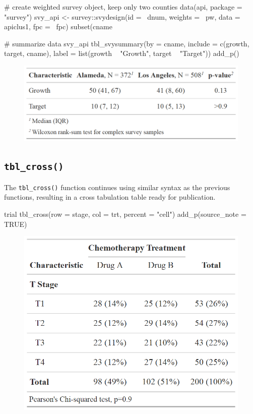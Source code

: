 \begin{example}
# create weighted survey object, keep only two counties
data(api, package = "survey")
svy_api <- 
  survey::svydesign(id = ~dnum, weights = ~pw, data = apiclus1, fpc = ~fpc) %
  subset(cname %

# summarize data
svy_api %
  tbl_svysummary(by = cname, 
                 include = c(growth, target, cname),
                 label = list(growth ~ "Growth",
                              target ~ "Target")) %
  add_p()
\end{example}
\begin{figure}[h!]
  \includegraphics[scale=0.28]{svysummary.png}
  \centering
\end{figure}

\subsection{\texorpdfstring{\texttt{tbl\_cross()}}{tbl\_cross()}}

The \texttt{tbl\_cross()} function continues using similar syntax as the previous functions, resulting in a cross tabulation table ready for publication. 

\begin{example}
trial %
  tbl_cross(row = stage, col = trt, percent = "cell") %
  add_p(source_note = TRUE)
\end{example}
\begin{figure}[h!]
  \includegraphics[scale=0.28]{cross.png}
  \centering
\end{figure}

